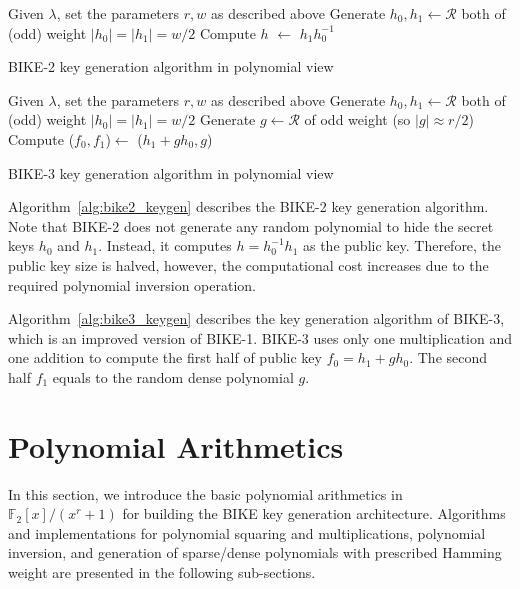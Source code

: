 \documentclass[runningheads]{llncs}
\begin{document}
\begin{algorithm}[!tbh]
 \DontPrintSemicolon %
    Given $\lambda$, set the parameters $r,w$ as described above\;
    Generate $h_0,h_1 \gets \mathcal{R}$ both of (odd) weight $|h_0|=|h_1|=w/2$\;
    Compute $h$ $\gets$ $h_1h_0^{-1}$\;
 \caption{BIKE-2 key generation algorithm in polynomial view  \cite{aragon2017bike}}\label{alg:bike2_keygen}
\end{algorithm}

\begin{algorithm}[!tbh]
 \DontPrintSemicolon %
    Given $\lambda$, set the parameters $r,w$ as described above\;
    Generate $h_0,h_1 \gets \mathcal{R}$ both of (odd) weight $|h_0|=|h_1|=w/2$\;
    Generate $g \gets \mathcal{R}$ of odd weight (so $|g|\approx r/2$)\;
    Compute ($f_0,f_1$)$\gets$ ($h_1+gh_0,g$)\;
 \caption{BIKE-3 key generation algorithm in polynomial view  \cite{aragon2017bike}}\label{alg:bike3_keygen}
\end{algorithm}


Algorithm~\ref{alg:bike2_keygen} describes the BIKE-2 key generation algorithm. Note that BIKE-2 does not generate any random polynomial to hide the secret keys $h_0$ and $h_1$. Instead, it computes $h=h_0^{-1}h_1$ as the public key.
Therefore, the public key size is halved, however, the computational cost
increases due to the required polynomial inversion operation.

Algorithm~\ref{alg:bike3_keygen} describes the key generation algorithm of BIKE-3,
which is an improved version of BIKE-1. 
BIKE-3 uses only one multiplication and one addition to compute the first half of public key $f_0=h_1+gh_0$. The second half $f_1$ equals to the random dense polynomial $g$.

\section{Polynomial Arithmetics}
\label{sec::modules}
In this section, we introduce the basic polynomial arithmetics
in $\mathbb{F}_2[x]/(x^r+1)$
for building the BIKE key generation architecture.
Algorithms and implementations for
polynomial squaring and multiplications,
polynomial inversion,
and generation of sparse/dense polynomials with prescribed Hamming weight
are presented in the following sub-sections.
\end{document}

